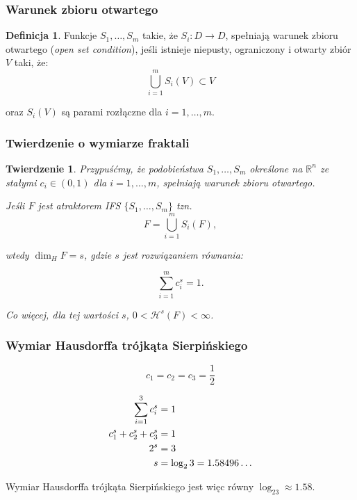 \documentclass[11pt,usenames,dvipsnames,svgnames,x11names]{beamer}
\theoremstyle{plain}
\newtheorem{twierdzenie}{Twierdzenie}
\theoremstyle{definition}
\newtheorem{definicja}{Definicja}
\theoremstyle{remark}
\begin{document}
\begin{frame}   %
\frametitle{Warunek zbioru otwartego}
\begin{definicja}
Funkcje $S_1,\ldots,S_m$ takie, że $S_i:D \longrightarrow D$, spełniają warunek zbioru otwartego (\textit{open set condition}), jeśli istnieje niepusty, ograniczony i otwarty zbiór $V$ taki, że:
$$
\bigcup^{m}_{i=1}S_i(V) \subset V
$$

oraz $S_i(V)$ są parami rozłączne dla $i=1,\ldots,m$. 
\end{definicja}
\end{frame}

\begin{frame}   %
\frametitle{Twierdzenie o wymiarze fraktali}
	\begin{twierdzenie}
Przypuśćmy, że podobieństwa $S_1,\ldots,S_m$ określone na $\mathbb{R}^n$ ze stałymi $c_i \in (0,1)$ dla $i=1,\ldots,m$, spełniają warunek zbioru otwartego.

Jeśli $F$ jest atraktorem IFS $\lbrace S_1,\ldots,S_m\rbrace$ tzn. 
$$
F = \bigcup^{m}_{i=1}{S_i(F)},
$$

wtedy $\dim_HF=s$, gdzie $s$ jest rozwiązaniem równania:

$$
\sum^m_{i=1}c_i^s=1.
$$

Co więcej, dla tej wartości $s$, $0<\mathcal{H}^s(F)<\infty$.
	\end{twierdzenie}
\end{frame}

\begin{frame}   %
\frametitle{Wymiar Hausdorffa trójkąta Sierpińskiego}

$$c_1=c_2=c_3=\frac{1}{2}$$

$$
\aligned
\sum_{i=1}^3 c_i^s&=1\\
c_1^s+c_2^s+c_3^s&=1\\
2^s&=3 \\
s&=\log_2 3 = 1.58496\ldots 
\endaligned
$$

Wymiar Hausdorffa trójkąta Sierpińskiego jest więc równy $\log_23 \approx 1.58$.

\end{frame}
\end{document}
